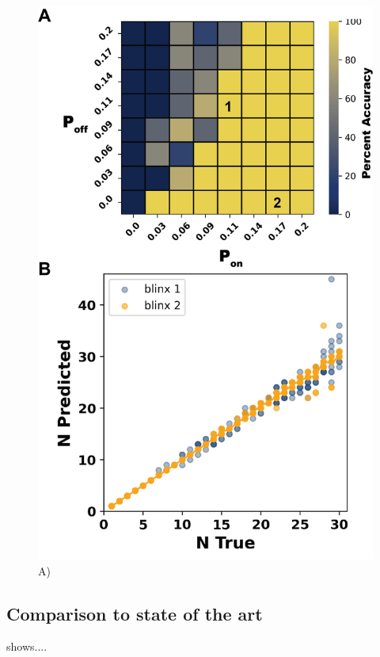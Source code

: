 \begin{figure}[ht]
  \includegraphics[width=\linewidth]{figures/kinetic_regime}
  \caption{A) }
  \label{fig:results:regime}
\end{figure}

\subsection{Comparison to state of the art \lbfcs}

 shows....

